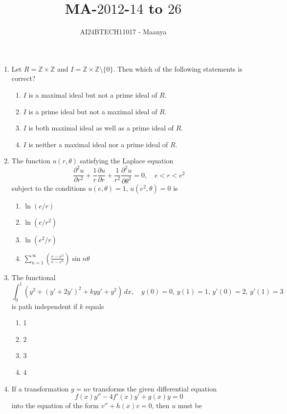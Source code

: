 \documentclass[journal,12pt,onecolumn]{IEEEtran}
\theoremstyle{remark}
\begin{document}

\vspace{3cm}

\title{MA-$2012$-$14$ to $26$}
\author{AI24BTECH11017 - Maanya}
\maketitle
\bigskip
\renewcommand{\thefigure}{\theenumi}
\renewcommand{\thetable}{\theenumi}
\begin{enumerate}[start=14]
\item Let \( R = \mathbb{Z} \times \mathbb{Z} \) and \( I = \mathbb{Z} \times \mathbb{Z} \setminus \{0\} \).  
Then which of the following statements is correct?

\begin{enumerate}
    \item \( I \) is a maximal ideal but not a prime ideal of \( R \).
    \item \( I \) is a prime ideal but not a maximal ideal of \( R \).
    \item \( I \) is both maximal ideal as well as a prime ideal of \( R \).
    \item \( I \) is neither a maximal ideal nor a prime ideal of \( R \).
\end{enumerate}
\item The function \( u(r, \theta) \) satisfying the Laplace equation
\[
\frac{\partial^2 u}{\partial r^2} + \frac{1}{r} \frac{\partial u}{\partial r} + \frac{1}{r^2} \frac{\partial^2 u}{\partial \theta^2} = 0, \quad e < r < e^2
\]
subject to the conditions \( u(e, \theta) = 1 \), \( u(e^2, \theta) = 0 \) is

\begin{enumerate}
    \item \( \ln(e / r) \)
    \item \( \ln(e / r^2) \)
    \item \( \ln(e^2 / r) \)
    \item \( \sum_{n=1}^{\infty} \left( \frac{r - e^2}{e - e^2} \right) \sin n\theta \)
\end{enumerate}
\item The functional
\[
\int_0^1 \left( y^2 + (y' + 2y')^2 + kyy' + y^2 \right) \, dx, \quad y(0) = 0, \, y(1) = 1, \, y'(0) = 2, \, y'(1) = 3
\]
is path independent if \( k \) equals

\begin{enumerate}
    \item 1
    \item 2
    \item 3
    \item 4
\end{enumerate}
\item If a transformation \( y = u v \) transforms the given differential equation 
\[
f(x)y'' - 4 f'(x) y' + g(x)y = 0 
\]
into the equation of the form \( v'' + h(x)v = 0 \), then \( u \) must be


\end{enumerate}
\end{document}
